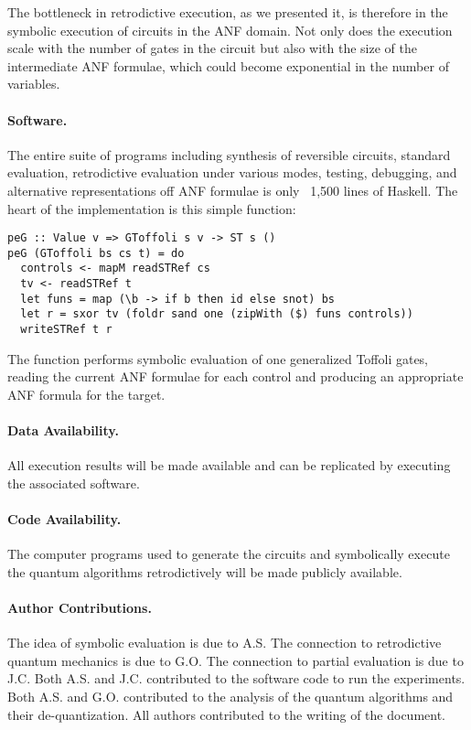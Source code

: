 \documentclass[sigplan]{acmart}
\begin{document}
The bottleneck in retrodictive execution, as we presented it, is
therefore in the symbolic execution of circuits in the ANF domain. Not
only does the execution scale with the number of gates in the circuit
but also with the size of the intermediate ANF formulae, which could
become exponential in the number of variables.

\paragraph*{Software.}
The entire suite of programs including synthesis of reversible
circuits, standard evaluation, retrodictive evaluation under various
modes, testing, debugging, and alternative representations off ANF
formulae is only ~1,500 lines of Haskell. The heart of the
implementation is this simple function:

\begin{verbatim}
peG :: Value v => GToffoli s v -> ST s ()
peG (GToffoli bs cs t) = do
  controls <- mapM readSTRef cs
  tv <- readSTRef t
  let funs = map (\b -> if b then id else snot) bs
  let r = sxor tv (foldr sand one (zipWith ($) funs controls))
  writeSTRef t r
\end{verbatim}
The function performs symbolic evaluation of one generalized Toffoli
gates, reading the current ANF formulae for each control and producing
an appropriate ANF formula for the target.

\paragraph*{Data Availability.}
All execution results will be made available and can be replicated by
executing the associated software.

\paragraph*{Code Availability.}
The computer programs used to generate the circuits and symbolically
execute the quantum algorithms retrodictively will be made publicly
available.

\paragraph*{Author Contributions.}
The idea of symbolic evaluation is due to A.S. The connection to
retrodictive quantum mechanics is due to G.O. The connection to
partial evaluation is due to J.C. Both A.S. and J.C. contributed to
the software code to run the experiments. Both A.S. and
G.O. contributed to the analysis of the quantum algorithms and their
de-quantization. All authors contributed to the writing of the
document.
\end{document}

